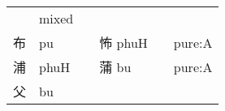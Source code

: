 \documentclass[14pt,a4paper]{scrartcl}
\begin{document}
\begin{longtable}[c]{@{}llllll@{}}
\begin{minipage}[t]{0.14\columnwidth}\raggedright\strut
\strut\end{minipage} &
\begin{minipage}[t]{0.14\columnwidth}\raggedright\strut
mixed
\strut\end{minipage}\tabularnewline
\begin{minipage}[t]{0.14\columnwidth}\raggedright\strut
布
\strut\end{minipage} &
\begin{minipage}[t]{0.14\columnwidth}\raggedright\strut
pu
\strut\end{minipage} &
\begin{minipage}[t]{0.14\columnwidth}\raggedright\strut
\strut\end{minipage} &
\begin{minipage}[t]{0.14\columnwidth}\raggedright\strut
怖 phuH
\strut\end{minipage} &
\begin{minipage}[t]{0.14\columnwidth}\raggedright\strut
\strut\end{minipage} &
\begin{minipage}[t]{0.14\columnwidth}\raggedright\strut
pure:A
\strut\end{minipage}\tabularnewline
\begin{minipage}[t]{0.14\columnwidth}\raggedright\strut
浦
\strut\end{minipage} &
\begin{minipage}[t]{0.14\columnwidth}\raggedright\strut
phuH
\strut\end{minipage} &
\begin{minipage}[t]{0.14\columnwidth}\raggedright\strut
\strut\end{minipage} &
\begin{minipage}[t]{0.14\columnwidth}\raggedright\strut
蒲 bu
\strut\end{minipage} &
\begin{minipage}[t]{0.14\columnwidth}\raggedright\strut
\strut\end{minipage} &
\begin{minipage}[t]{0.14\columnwidth}\raggedright\strut
pure:A
\strut\end{minipage}\tabularnewline
\begin{minipage}[t]{0.14\columnwidth}\raggedright\strut
父
\strut\end{minipage} &
\begin{minipage}[t]{0.14\columnwidth}\raggedright\strut
bu
\strut\end{minipage} &

\end{longtable}
\end{document}
